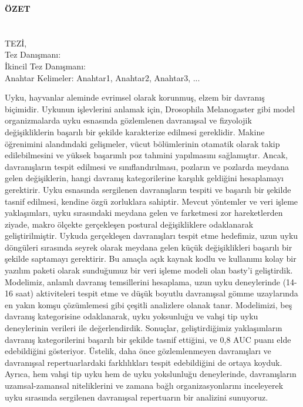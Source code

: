 \clearpage\pagebreak
\begin{center}
	\MakeUppercase{\textbf{Özet}} \\ [3\baselineskip]
	\MakeUppercase{\thesistitletr} \\ [3\baselineskip]
	\MakeUppercase{\student} \\[\baselineskip]
	\MakeUppercase{\majortr \degreetr Tez\.{ı}, \monthtr~\year} \\[\baselineskip]
	Tez Danışmanı: \advisortr \\
	İkincil Tez Danışmanı: \coadvisortr \\
	[2\baselineskip]
	Anahtar Kelimeler: Anahtar1, Anahtar2, Anahtar3, ... \\[2\baselineskip]
\end{center}

\onehalfspacing

Uyku, hayvanlar aleminde evrimsel olarak korunmuş, elzem bir davranış biçimidir.
Uykunun işlevlerini anlamak için, Drosophila Melanogaster gibi model organizmalarda uyku esnasında gözlemlenen davranışsal ve fizyolojik değişikliklerin başarılı bir şekilde karakterize edilmesi gereklidir.
Makine öğrenimini alandındaki gelişmeler, vücut bölümlerinin otamatik olarak takip edilebilmesini ve yüksek başarımlı poz tahmini yapılmasını sağlamıştır.
Ancak, davranışların tespit edilmesi ve sınıflandırılması, pozların ve pozlarda meydana gelen değişiklerin, hangi davranış kategorilerine karşılık geldiğini hesaplamayı gerektirir.
Uyku esnasında sergilenen davranı\c{s}ların tespiti ve başarılı bir şekilde tasnif edilmesi, kendine özgü zorluklara sahiptir.
Mevcut yöntemler ve veri işleme yaklaşımları, uyku sırasındaki meydana gelen ve farketmesi zor hareketlerden ziyade, makro ölçekte gerçekleşen postural değişikliklere odaklanarak geliştirilmiştir.
Uykuda gerçekleşen davranışları tespit etme hedefimiz, uzun uyku döngüleri sırasında seyrek olarak meydana gelen küçük değişiklikleri başarılı bir şekilde saptamayı gerektirir.
Bu amaçla açık kaynak kodlu ve kullanımı kolay bir yazılım paketi olarak sunduğumuz bir veri işleme modeli olan basty’i geliştirdik.
Modelimiz, anlamlı davranış temsillerini hesaplama, uzun uyku deneylerinde (14-16 saat) aktiviteleri tespit etme ve düşük boyutlu davranışsal gömme uzaylarında en yakın komşu çözümlemesi gibi çeşitli analizlere olanak tanır.
Modelimizi, beş davranış kategorisine odaklanarak, uyku yoksunluğu ve vahşi tip uyku deneylerinin verileri ile değerlendirdik.
Sonuçlar, geliştirdiğimiz yaklaşımların davranış kategorilerini başarılı bir şekilde tasnif ettiğini, ve 0,8 AUC puanı elde edebildiğini gösteriyor.
Üstelik, daha önce gözlemlenmeyen davranışları ve davranışsal repertuarlardaki farklılıkları tespit edebildiğini de ortaya koyduk.
Ayrıca, hem vahşi tip uyku hem de uyku yokslunluğu deneylerinde, davranışların uzamsal-zamansal niteliklerini ve zamana bağlı organizasyonlarını inceleyerek uyku sırasında sergilenen davranışsal repertuarın bir analizini sunuyoruz.
